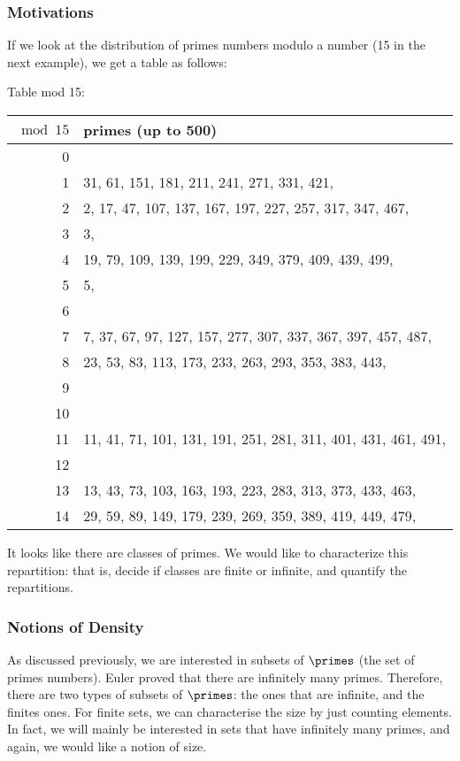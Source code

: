 \subsubsection{Motivations}
\label{DensityMotivation}
If we look at the distribution of primes numbers modulo a number (15 in the next example), we get a table as follows:

Table mod 15:
\begin{center}
	\begin{tabular}{r|l}
		$\bmod 15$ & primes (up to 500)\\
		\hline
		0& \\
		1& 31, 61, 151, 181, 211, 241, 271, 331, 421, \\
		2& 2, 17, 47, 107, 137, 167, 197, 227, 257, 317, 347, 467, \\
		3& 3, \\
		4& 19, 79, 109, 139, 199, 229, 349, 379, 409, 439, 499, \\
		5& 5, \\
		6& \\
		7& 7, 37, 67, 97, 127, 157, 277, 307, 337, 367, 397, 457, 487, \\
		8& 23, 53, 83, 113, 173, 233, 263, 293, 353, 383, 443, \\
		9& \\
		10& \\
		11& 11, 41, 71, 101, 131, 191, 251, 281, 311, 401, 431, 461, 491, \\
		12& \\
		13& 13, 43, 73, 103, 163, 193, 223, 283, 313, 373, 433, 463, \\
		14& 29, 59, 89, 149, 179, 239, 269, 359, 389, 419, 449, 479, \\
	\end{tabular}
\end{center}
It looks like there are classes of primes.
We would like to characterize this repartition: that is, decide if classes are finite or infinite, and quantify the repartitions.



\subsubsection{Notions of Density}
As discussed previously, we are interested in subsets of $\primes$ (the set of primes numbers).
Euler proved that there are infinitely many primes.
Therefore, there are two types of subsets of $\primes$: the ones that are infinite, and the finites ones.
For finite sets, we can characterise the size by just counting elements.
In fact, we will mainly be interested in sets that have infinitely many primes, and again, we would like a notion of size.

